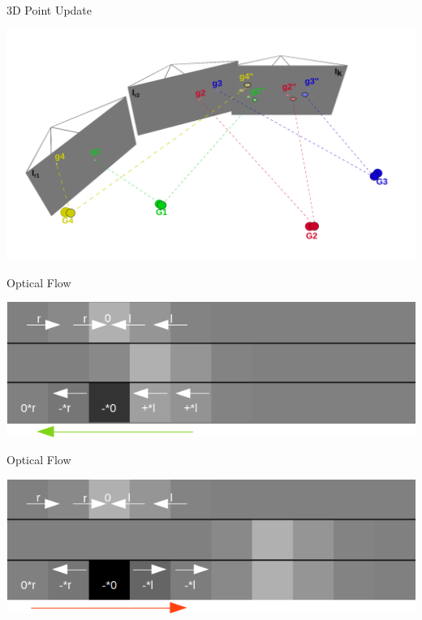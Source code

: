 \documentclass[aspectratio=169]{beamer}
\begin{document}
\begin{frame}{3D Point Update}
  \begin{center}
    \includegraphics[height=0.9\textheight]{../img/pose_estimation_point_update.png}
  \end{center}
\end{frame}

\begin{frame}{Optical Flow}
  \begin{center}
    \includegraphics[scale=0.6]{../img/optical_flow_intuitive_1.png}
  \end{center}
\end{frame}

\begin{frame}{Optical Flow}
  \begin{center}
    \includegraphics[scale=0.6]{../img/optical_flow_intuitive_2.png}
  \end{center}
\end{frame}
\end{document}

